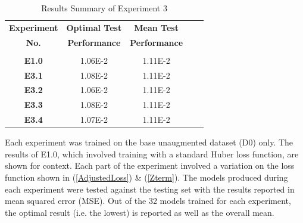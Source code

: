 \begin{table}[h!]
	 \begin{center}
		
		\begin{tabular}{c|c|c|r|c} %
			\textbf{Experiment} & \textbf{Optimal Test} & \textbf{Mean Test}  \\
			
			\textbf{No.} & \textbf{Performance} & \textbf{Performance}  \\
			
			\hline
			& & \\
			\textbf{E1.0} & 1.06E-2 & 1.11E-2 \\
			\textbf{E3.1} & 1.08E-2 & 1.11E-2 \\  
			\textbf{E3.2} & 1.06E-2 & 1.11E-2 \\
			\textbf{E3.3} & 1.08E-2 & 1.11E-2 \\
			\textbf{E3.4} & 1.07E-2 & 1.11E-2 \\ 
			
		\end{tabular}
		\caption{Results Summary of Experiment 3} {Each experiment was trained on the base unaugmented dataset (D0) only. The results of E1.0, which involved training with a standard Huber loss function, are shown for context. Each part of the experiment involved a variation on the loss function shown in (\ref{AdjustedLoss}) \& (\ref{Zterm}). The models produced during each experiment were tested against the testing set with the results reported in mean squared error (MSE). Out of the 32 models trained for each experiment, the optimal result (i.e. the lowest) is reported as well as the overall mean.  }
		\label{tab:Experiment3results}
		 \end{center}
\end{table}

